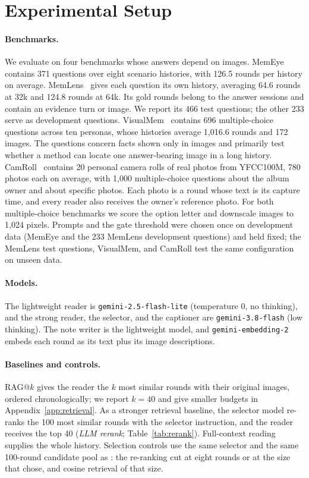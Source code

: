 \section{Experimental Setup}
\label{sec:setup}

\paragraph{Benchmarks.} We evaluate on four benchmarks whose answers depend on images. MemEye~\citep{guo2026memeye} contains 371 questions over eight scenario histories, with 126.5 rounds per history on average. MemLens~\citep{ren2026memlens} gives each question its own history, averaging 64.6 rounds at 32k and 124.8 rounds at 64k. Its gold rounds belong to the answer sessions and contain an evidence turn or image. We report its 466 test questions; the other 233 serve as development questions. VisualMem~\citep{nguyen2026personalvisual} contains 696 multiple-choice questions across ten personas, whose histories average 1,016.6 rounds and 172 images. The questions concern facts shown only in images and primarily test whether a method can locate one answer-bearing image in a long history. CamRoll~\citep{nguyen2026camroll} contains 20 personal camera rolls of real photos from YFCC100M, 780 photos each on average, with 1,000 multiple-choice questions about the album owner and about specific photos. Each photo is a round whose text is its capture time, and every reader also receives the owner's reference photo. For both multiple-choice benchmarks we score the option letter and downscale images to 1,024 pixels. Prompts and the gate threshold were chosen once on development data (MemEye and the 233 MemLens development questions) and held fixed; the MemLens test questions, VisualMem, and CamRoll test the same configuration on unseen data.

\paragraph{Models.} The lightweight reader is \texttt{gemini-2.5-flash-lite} (temperature 0, no thinking), and the strong reader, the selector, and the captioner are \texttt{gemini-3.8-flash} (low thinking). The note writer is the lightweight model, and \texttt{gemini-embedding-2} embeds each round as its text plus its image descriptions.

\paragraph{Baselines and controls.} RAG@$k$ gives the reader the $k$ most similar rounds with their original images, ordered chronologically; we report $k{=}40$ and give smaller budgets in Appendix~\ref{app:retrieval}. As a stronger retrieval baseline, the selector model re-ranks the 100 most similar rounds with the selector instruction, and the reader receives the top 40 (\emph{LLM rerank}; Table~\ref{tab:rerank}). Full-context reading supplies the whole history. Selection controls use the same selector and the same 100-round candidate pool as \qss{}: the re-ranking cut at eight rounds or at the size that \qss{} chose, and cosine retrieval of that size.

